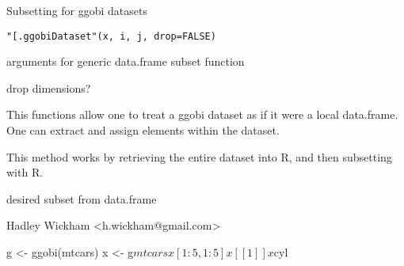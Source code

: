 \HeaderA{"[.ggobiDataset"}{Subsettting}{"[.ggobiDataset"}
\aliasA{\$.ggobiDataset}{"[.ggobiDataset"}{.Rdol..ggobiDataset}
\aliasA{[.ggobiDataset}{"[.ggobiDataset"}{[.ggobiDataset}
\aliasA{[[.ggobiDataset}{"[.ggobiDataset"}{[[.ggobiDataset}
\keyword{manip}{"[.ggobiDataset"}
\begin{Description}\relax
Subsetting for ggobi datasets
\end{Description}
\begin{Usage}
\begin{verbatim}"[.ggobiDataset"(x, i, j, drop=FALSE)\end{verbatim}
\end{Usage}
\begin{Arguments}
\begin{ldescription}
\item[\code{x}] arguments for generic data.frame subset function
\item[\code{i}] drop dimensions?
\item[\code{j}] 
\item[\code{drop}] 
\end{ldescription}
\end{Arguments}
\begin{Details}\relax
This functions allow one to treat a ggobi dataset as if it were a local
data.frame.  One can extract and assign elements within the dataset.

This method works by retrieving the entire dataset into
R, and then subsetting with R.
\end{Details}
\begin{Value}
desired subset from data.frame
\end{Value}
\begin{Author}\relax
Hadley Wickham <h.wickham@gmail.com>
\end{Author}
\begin{Examples}
\begin{ExampleCode}g <- ggobi(mtcars)
x <- g$mtcars
x[1:5, 1:5]
x[[1]]
x$cyl\end{ExampleCode}
\end{Examples}

